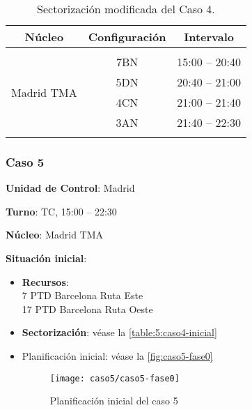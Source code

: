 \begin{table}[h]
	\centering
	\caption{Sectorización modificada del Caso 4.}
	\label{table:D:caso4-modif}
	\begin{tabular}{lcl}
		\hline
		\multicolumn{1}{c}{\textbf{Núcleo}}              & \textbf{Configuración} & \multicolumn{1}{c}{\textbf{Intervalo}} \\ \hline
		& \multicolumn{1}{l}{}   &                                        \\
		\multicolumn{1}{l|}{\multirow{4}{*}{Madrid TMA}} & 7BN                    & 15:00 -- 20:40                         \\
		\multicolumn{1}{l|}{}                            & 5DN                    & 20:40 -- 21:00                         \\
		\multicolumn{1}{l|}{}                            & 4CN                    & 21:00 -- 21:40                         \\
		\multicolumn{1}{l|}{}                            & 3AN                    & 21:40 -- 22:30                         \\
		\multicolumn{1}{c}{}                             &                        & \multicolumn{1}{c}{}                   \\ \hline
	\end{tabular}
\end{table}

\subsubsection{Caso 5}

\textbf{Unidad de Control}: Madrid

\textbf{Turno}: TC, 15:00 -- 22:30

\textbf{Núcleo}: Madrid TMA

\textbf{Situación inicial}:
\begin{itemize}[label={}]
	
	\item \textbf{Recursos}: \\
	7 PTD Barcelona Ruta Este \\
	17 PTD Barcelona Ruta Oeste
	
	
	\item \textbf{Sectorización}: véase la \autoref{table:5:caso4-inicial}
	
	\item Planificación inicial: véase la \autoref{fig:caso5-fase0}

	\begin{figure}[!h]
		\centering
		\texttt{[image: caso5/caso5-fase0]}
		\caption{Planificación inicial del caso 5}
		\label{fig:5:caso5-fase0}
	\end{figure}

\end{itemize}

